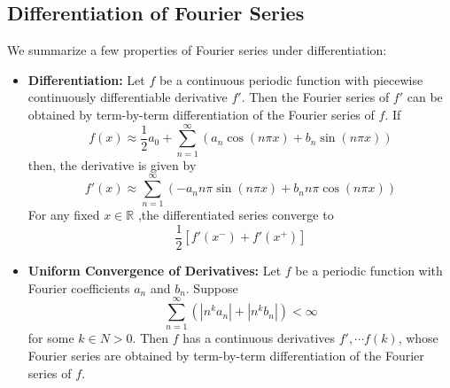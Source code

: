 \documentclass[11pt]{article}
\newcommand{\R}{\mathbb{R}}
\begin{document}
\subsection{Differentiation of Fourier Series}
We summarize a few properties of Fourier series under differentiation:
\begin{itemize}
\item \textbf{Differentiation:} Let $f$ be a continuous periodic function with piecewise continuously differentiable derivative $f'$. Then the Fourier series of $f'$ can be obtained by term-by-term differentiation of the Fourier series of $f$. If$$ f(x) \approx \frac{1}{2} a_0 + \sum_{n=1}^{\infty} \left( a_n \cos (n\pi x) + b_n \sin (n\pi x) \right)$$ then, the derivative is given by
$$ f'(x) \approx  \sum_{n=1}^{\infty} \left( -a_n n \pi \sin (n\pi x) + b_n n\pi \cos (n\pi x) \right)$$
For any fixed $x \in \R$ ,the differentiated series converge to 
$$\frac{1}{2} \left [f'(x^-)+f'(x^+) \right]$$
\item \textbf{Uniform Convergence of Derivatives:} Let $f$ be a periodic function with Fourier coefficients $a_n$ and $b_n$. Suppose
$$ \sum_{n=1}^{\infty} \left( |n^ka_n| + |n^kb_n| \right) < \infty $$
for some $k \in N>0$. Then $f$ has a continuous derivatives $f',  \cdots f(k)$, whose Fourier series are obtained by term-by-term differentiation of the Fourier series of $f$.
\end{itemize}

\pagebreak
\end{document}

